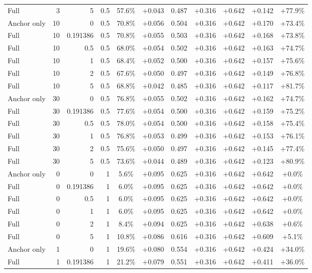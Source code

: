 \begin{table}[htbp]
\begin{tabular}{lrrrccccccc}
Full & 3 & 5 & 0.5 & 57.6\% & +0.043 & 0.487 & +0.316 & +0.642 & +0.142 & +77.9\% \\
Anchor only & 10 & 0 & 0.5 & 70.8\% & +0.056 & 0.504 & +0.316 & +0.642 & +0.170 & +73.4\% \\
Full & 10 & 0.191386 & 0.5 & 70.8\% & +0.055 & 0.503 & +0.316 & +0.642 & +0.168 & +73.8\% \\
Full & 10 & 0.5 & 0.5 & 68.0\% & +0.054 & 0.502 & +0.316 & +0.642 & +0.163 & +74.7\% \\
Full & 10 & 1 & 0.5 & 68.4\% & +0.052 & 0.500 & +0.316 & +0.642 & +0.157 & +75.6\% \\
Full & 10 & 2 & 0.5 & 67.6\% & +0.050 & 0.497 & +0.316 & +0.642 & +0.149 & +76.8\% \\
Full & 10 & 5 & 0.5 & 68.8\% & +0.042 & 0.485 & +0.316 & +0.642 & +0.117 & +81.7\% \\
Anchor only & 30 & 0 & 0.5 & 76.8\% & +0.055 & 0.502 & +0.316 & +0.642 & +0.162 & +74.7\% \\
Full & 30 & 0.191386 & 0.5 & 77.6\% & +0.054 & 0.500 & +0.316 & +0.642 & +0.159 & +75.2\% \\
Full & 30 & 0.5 & 0.5 & 78.0\% & +0.054 & 0.500 & +0.316 & +0.642 & +0.158 & +75.4\% \\
Full & 30 & 1 & 0.5 & 76.8\% & +0.053 & 0.499 & +0.316 & +0.642 & +0.153 & +76.1\% \\
Full & 30 & 2 & 0.5 & 75.6\% & +0.050 & 0.497 & +0.316 & +0.642 & +0.145 & +77.4\% \\
Full & 30 & 5 & 0.5 & 73.6\% & +0.044 & 0.489 & +0.316 & +0.642 & +0.123 & +80.9\% \\
Anchor only & 0 & 0 & 1 & 5.6\% & +0.095 & 0.625 & +0.316 & +0.642 & +0.642 & +0.0\% \\
Full & 0 & 0.191386 & 1 & 6.0\% & +0.095 & 0.625 & +0.316 & +0.642 & +0.642 & +0.0\% \\
Full & 0 & 0.5 & 1 & 6.0\% & +0.095 & 0.625 & +0.316 & +0.642 & +0.642 & +0.0\% \\
Full & 0 & 1 & 1 & 6.0\% & +0.095 & 0.625 & +0.316 & +0.642 & +0.642 & +0.0\% \\
Full & 0 & 2 & 1 & 8.4\% & +0.094 & 0.625 & +0.316 & +0.642 & +0.638 & +0.6\% \\
Full & 0 & 5 & 1 & 10.8\% & +0.086 & 0.616 & +0.316 & +0.642 & +0.609 & +5.1\% \\
Anchor only & 1 & 0 & 1 & 19.6\% & +0.080 & 0.554 & +0.316 & +0.642 & +0.424 & +34.0\% \\
Full & 1 & 0.191386 & 1 & 21.2\% & +0.079 & 0.551 & +0.316 & +0.642 & +0.411 & +36.0\% \\

\end{tabular}
\end{table}
